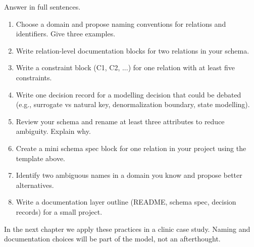 \begin{exercisebox}
Answer in full sentences.
\begin{enumerate}[label=\arabic*.]
  \item Choose a domain and propose naming conventions for relations and identifiers. Give three examples.
  \item Write relation-level documentation blocks for two relations in your schema.
  \item Write a constraint block (C1, C2, ...) for one relation with at least five constraints.
  \item Write one decision record for a modelling decision that could be debated (e.g., surrogate vs natural key, denormalization boundary, state modelling).
  \item Review your schema and rename at least three attributes to reduce ambiguity. Explain why.
  \item Create a mini schema spec block for one relation in your project using the template above.
  \item Identify two ambiguous names in a domain you know and propose better alternatives.
  \item Write a documentation layer outline (README, schema spec, decision records) for a small project.
\end{enumerate}
\end{exercisebox}

In the next chapter we apply these practices in a clinic case study.
Naming and documentation choices will be part of the model, not an afterthought.
